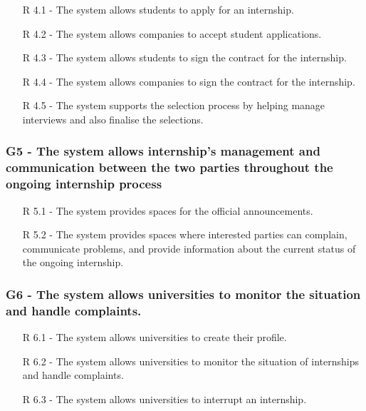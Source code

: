 \begin{itemize}
    \item [R 4.1] - The system allows students to apply for an internship.
    \item [R 4.2] - The system allows companies to accept student applications.
    \item [R 4.3] - The system allows students to sign the contract for the internship.
    \item [R 4.4] - The system allows companies to sign the contract for the internship.
    \item [R 4.5] - The system supports the selection process by helping manage interviews and also finalise the selections.
\end{itemize}
\hspace*{15mm}

\subsubsection{G5 - The system allows internship's management and communication between the two parties
throughout the ongoing internship process}
\hspace*{15mm}
\begin{itemize}
    \item [R 5.1] - The system provides spaces for the official announcements.
    \item [R 5.2] - The system provides spaces where interested parties can complain,
    communicate problems, and provide information about the current status of the ongoing internship.
\end{itemize}
\hspace*{15mm}

\subsubsection{G6 - The system allows universities to monitor the situation and handle complaints.}
\hspace*{15mm}
\begin{itemize}
    \item [R 6.1] - The system allows universities to create their profile.
    \item [R 6.2] - The system allows universities to monitor the situation of internships and handle complaints.
    \item [R 6.3] - The system allows universities to interrupt an internship.
\end{itemize}
\hspace*{15mm}


